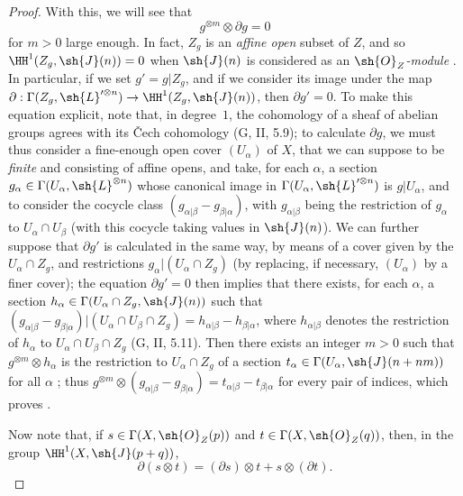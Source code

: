 \begin{proof}
  With this, we will see that
  \[
  \label{II.4.5.13.2}
    g^{\otimes m}\otimes\partial g = 0
  \tag{4.5.13.2}
  \]
  for $m>0$ large enough.
  In fact, $Z_g$ is an \emph{affine open} subset of $Z$, and so $\HH^1(Z_g,\sh{J}(n))=0$ when $\sh{J}(n)$ is considered as an \emph{$\sh{O}_Z$-module} .
  In particular, if we set $g'=g|Z_g$, and if we consider its image under the map $\partial:\Gamma(Z_g,\sh{L}'^{\otimes n})\to\HH^1(Z_g,\sh{J}(n))$, then $\partial g'=0$.
  To make this equation explicit, note that, in degree~$1$, the cohomology of a sheaf of abelian groups agrees with its \v{C}ech cohomology (G, II, 5.9);
  to calculate $\partial g$, we must thus consider a fine-enough open cover $(U_\alpha)$ of $X$, that we can suppose to be \emph{finite} and consisting of affine opens, and take, for each $\alpha$, a section $g_\alpha\in\Gamma(U_\alpha,\sh{L}^{\otimes n})$ whose canonical image in $\Gamma(U_\alpha,\sh{L}'^{\otimes n})$ is $g|U_\alpha$, and to consider the cocycle class $(g_{\alpha|\beta}-g_{\beta|\alpha})$, with $g_{\alpha|\beta}$ being the restriction of $g_\alpha$ to $U_\alpha\cap U_\beta$ (with this cocycle taking values in $\sh{J}(n)$).
  We can further suppose that $\partial g'$ is calculated in the same way, by means of a cover given by the $U_\alpha\cap Z_g$, and restrictions $g_\alpha|(U_\alpha\cap Z_g)$ (by replacing, if necessary, $(U_\alpha)$ by a finer cover);
  the equation $\partial g'=0$ then implies that there exists, for each $\alpha$, a section $h_\alpha\in\Gamma(U_\alpha\cap Z_g,\sh{J}(n))$ such that $(g_{\alpha|\beta}-g_{\beta|\alpha})|(U_\alpha\cap U_\beta\cap Z_g) = h_{\alpha|\beta}-h_{\beta|\alpha}$, where $h_{\alpha|\beta}$ denotes the restriction of $h_\alpha$ to $U_\alpha\cap U_\beta\cap Z_g$ (G, II, 5.11).
  Then there exists an integer $m>0$ such that $g^{\otimes m}\otimes h_\alpha$ is the restriction to $U_\alpha\cap Z_g$ of a section $t_\alpha\in\Gamma(U_\alpha,\sh{J}(n+nm))$ for all $\alpha$ ;
  thus $g^{\otimes m}\otimes(g_{\alpha|\beta}-g_{\beta|\alpha})=t_{\alpha|\beta}-t_{\beta|\alpha}$ for every pair of indices, which proves .

  Now note that, if $s\in\Gamma(X,\sh{O}_Z(p))$ and $t\in\Gamma(X,\sh{O}_Z(q))$, then, in the group $\HH^1(X,\sh{J}(p+q))$,
  \[
  \label{II.4.5.13.3}
    \partial(s\otimes t) = (\partial s)\otimes t + s\otimes(\partial t).
  \tag{4.5.13.3}
  \]


\end{proof}
